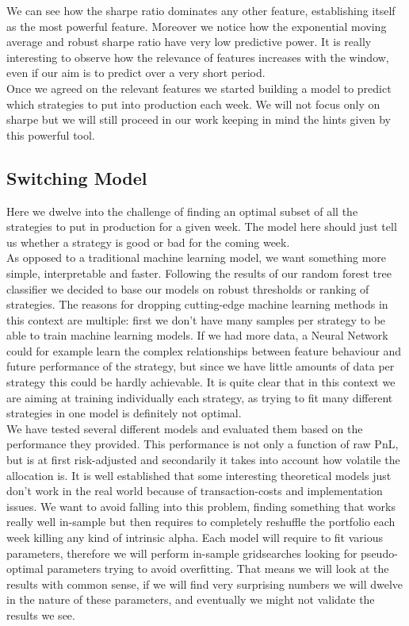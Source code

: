 \documentclass[a4paper]{article}
\numberwithin{equation}{subsection}
\begin{document}

We can see how the sharpe ratio dominates any other feature, establishing itself as the most powerful feature. Moreover we notice how the exponential moving average and robust sharpe ratio have very low predictive power. It is really interesting to observe how the relevance of features increases with the window, even if our aim is to predict over a very short period.\\
Once we agreed on the relevant features we started building a model to predict which strategies to put into production each week. We will not focus only on sharpe but we will still proceed in our work keeping in mind the hints given by this powerful tool.\\



\subsection*{Switching Model}

Here we dwelve into the challenge of finding an optimal subset of all the strategies to put in production for a given week. The model here should just tell us whether a strategy is good or bad for the coming week.\\
As opposed to a traditional machine learning model, we want something more simple, interpretable and faster. Following the results of our random forest tree classifier we decided to base our models on robust thresholds or ranking of strategies. The reasons for dropping cutting-edge machine learning methods in this context are multiple: first we don't have many samples per strategy to be able to train machine learning models. If we had more data, a Neural Network could for example learn the complex relationships between feature behaviour and future performance of the strategy, but since we have little amounts of data per strategy this could be hardly achievable. It is quite clear that in this context we are aiming at training individually each strategy, as trying to fit many different strategies in one model is definitely not optimal.\\
We have tested several different models and evaluated them based on the performance they provided. This performance is not only a function of raw PnL, but is at first risk-adjusted and secondarily it takes into account how volatile the allocation is. It is well established that some interesting theoretical models just don't work in the real world because of transaction-costs and implementation issues. We want to avoid falling into this problem, finding something that works really well in-sample but then requires to completely reshuffle the portfolio each week killing any kind of intrinsic alpha.
Each model will require to fit various parameters, therefore we will perform in-sample gridsearches looking for pseudo-optimal parameters trying to avoid overfitting. That means we will look at the results with common sense, if we will find very surprising numbers we will dwelve in the nature of these parameters, and eventually we might not validate the results we see.\\
\end{document}
